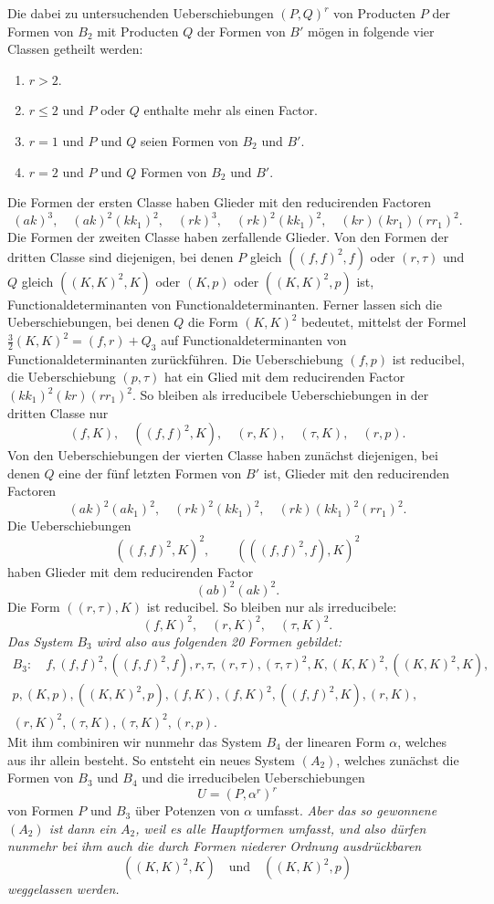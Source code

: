 \documentclass[10pt]{article}
\begin{document}
Die dabei zu untersuchenden Ueberschiebungen $(P,Q)^r$ von Producten $P$ der Formen von $B_2$ mit Producten $Q$ der Formen von $B'$ mögen in folgende vier Classen getheilt werden:
\begin{enumerate}
\item[I.] $r>2$.
\item[II.] $r\leq 2$ und $P$ oder $Q$ enthalte mehr als einen Factor.
\item[III.] $r=1$ und $P$ und $Q$ seien Formen von $B_2$ und $B'$.
\item[IV.] $r=2$ und $P$ und $Q$ Formen von $B_2$ und $B'$.
\end{enumerate}
Die Formen der ersten Classe haben Glieder mit den reducirenden Factoren
\[
(ak)^3,
\quad (ak)^2(kk_1)^2,
\quad (rk)^3,
\quad (rk)^2(kk_1)^2,
\quad (kr)(kr_1)(rr_1)^2.
\]
Die Formen der zweiten Classe haben zerfallende Glieder. Von den Formen der dritten Classe sind diejenigen, bei denen $P$ gleich $((f,f)^2,f)$ oder $(r,\tau)$ und $Q$ gleich $((K,K)^2,K)$ oder $(K,p)$ oder $((K,K)^2,p)$ ist, Functionaldeterminanten von Functionaldeterminanten. Ferner lassen sich die Ueberschiebungen, bei denen $Q$ die Form $(K,K)^2$ bedeutet, mittelst der Formel $\frac32(K,K)^2=(f,r)+Q_3$ auf Functionaldeterminanten von Functionaldeterminanten zurückführen. Die Ueberschiebung $(f,p)$ ist reducibel, die Ueberschiebung $(p,\tau)$ hat ein Glied mit dem reducirenden Factor $(kk_1)^2(kr)(rr_1)^2$. So bleiben als irreducibele Ueberschiebungen in der dritten Classe nur
\[
(f,K),
\quad ((f,f)^2,K),
\quad (r,K),
\quad (\tau,K),
\quad (r,p).
\]
Von den Ueberschiebungen der vierten Classe haben zunächst diejenigen, bei denen $Q$ eine der fünf letzten Formen von $B'$ ist, Glieder mit den reducirenden Factoren
\[
(ak)^2(ak_1)^2,
\quad (rk)^2(kk_1)^2,
\quad (rk)(kk_1)^2(rr_1)^2.
\]
Die Ueberschiebungen
\[
((f,f)^2,K)^2,
\qquad (((f,f)^2,f),K)^2
\]
haben Glieder mit dem reducirenden Factor
\[
(ab)^2(ak)^2.
\]
Die Form $((r,\tau),K)$ ist reducibel. So bleiben nur als irreducibele:
\[
(f,K)^2,
\quad (r,K)^2,
\quad (\tau,K)^2.
\]
\textit{Das System $B_3$ wird also aus folgenden 20 Formen gebildet:}
\[
\begin{gathered}
B_3:
\quad f,(f,f)^2,((f,f)^2,f),r,\tau,(r,\tau),(\tau,\tau)^2,K,(K,K)^2,((K,K)^2,K),\\
p,(K,p),((K,K)^2,p),(f,K),(f,K)^2,((f,f)^2,K),(r,K),\\
(r,K)^2,(\tau,K),(\tau,K)^2,(r,p).
\end{gathered}
\]
Mit ihm combiniren wir nunmehr das System $B_4$ der linearen Form $\alpha$, welches aus ihr allein besteht. So entsteht ein neues System $(A_2)$, welches zunächst die Formen von $B_3$ und $B_4$ und die irreducibelen Ueberschiebungen
\[
U=(P,\alpha^r)^r
\]
von Formen $P$ und $B_3$ über Potenzen von $\alpha$ umfasst. \textit{Aber das so gewonnene $(A_2)$ ist dann ein $A_2$, weil es alle Hauptformen umfasst, und also dürfen nunmehr bei ihm auch die durch Formen niederer Ordnung ausdrückbaren}
\[
((K,K)^2,K)
\quad\text{und}\quad
((K,K)^2,p)
\]
\textit{weggelassen werden.}
\end{document}
